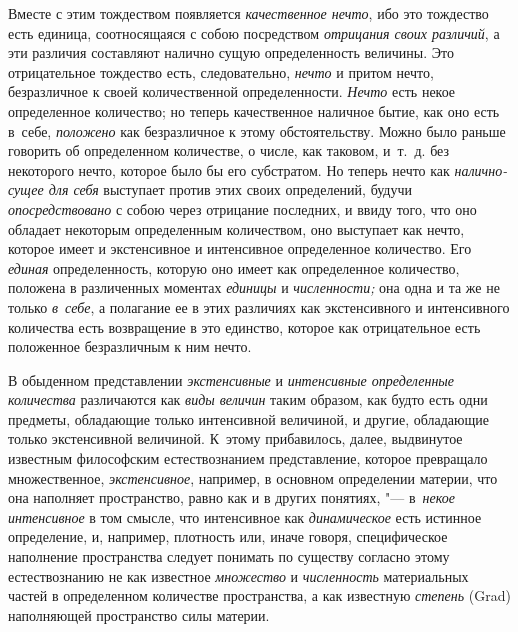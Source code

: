 Вместе с этим тождеством появляется {\em качественное нечто}, ибо это тождество
есть единица, соотносящаяся с собою посредством {\em отрицания своих различий},
а эти различия составляют налично сущую определенность величины. Это
отрицательное тождество есть, следовательно, {\em нечто} и притом нечто,
безразличное к своей количественной определенности. {\em Нечто} есть некое
определенное количество; но теперь качественное наличное бытие, как оно есть
в~себе, {\em положено} как безразличное к этому обстоятельству. Можно было
раньше говорить об определенном количестве, о числе, как таковом, и~т.~д. без
некоторого нечто, которое было бы его субстратом. Но теперь нечто как
{\em налично-сущее для себя} выступает против этих своих определений, будучи
{\em опосредствовано} с собою через отрицание последних, и ввиду того, что оно
обладает некоторым определенным количеством, оно выступает как нечто, которое
имеет и экстенсивное и интенсивное определенное количество. Его {\em единая}
определенность, которую оно имеет как определенное количество, положена в
различенных моментах {\em единицы} и {\em численности;} она одна и та же не
только {\em в~себе}, а полагание ее в этих различиях как экстенсивного и
интенсивного количества есть возвращение в это единство, которое как
отрицательное есть положенное безразличным к ним нечто.


В обыденном представлении {\em экстенсивные} и {\em интенсивные определенные
количества} различаются как {\em виды величин} таким образом, как будто есть
одни предметы, обладающие только интенсивной величиной, и другие, обладающие
только экстенсивной величиной. К~этому прибавилось, далее, выдвинутое известным
философским естествознанием представление, которое превращало множественное,
{\em экстенсивное}, например, в основном определении материи, что она наполняет
пространство, равно как и в других понятиях, "--- в~{\em некое интенсивное} в
том смысле, что интенсивное как {\em динамическое} есть истинное определение,
и, например, плотность или, иначе говоря, специфическое наполнение пространства
следует понимать по существу согласно этому естествознанию не как известное
{\em множество} и {\em численность} материальных частей в определенном
количестве пространства, а как известную {\em степень} (Grad) наполняющей
пространство силы материи.

